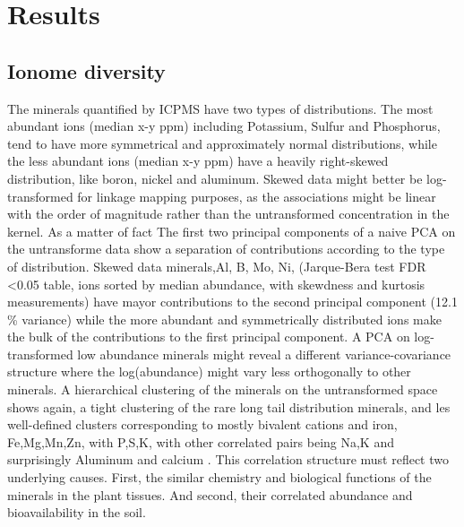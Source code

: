 \section{Results}
\subsection{Ionome diversity}
The minerals quantified by ICPMS have two types of distributions. The most abundant ions (median x-y ppm) including Potassium, Sulfur and Phosphorus, tend to have more symmetrical and approximately normal distributions, while the less abundant ions (median x-y ppm) have a  heavily right-skewed distribution, like boron, nickel and aluminum.
Skewed data might better be log-transformed for linkage mapping purposes, as the associations might be linear with the order of magnitude rather than the untransformed concentration in the kernel. As a matter of fact The first two principal components of a naive PCA on the untransforme data show a separation of contributions according to the type of distribution.
Skewed data minerals,Al, B, Mo, Ni, (Jarque-Bera test FDR <0.05 table, ions sorted by median abundance, with skewdness and kurtosis measurements) have mayor contributions to the second principal component (12.1 \% variance) while the more abundant and symmetrically distributed ions make the bulk of the contributions to the first principal component.
A PCA on log-transformed low abundance minerals might reveal a different variance-covariance structure where the log(abundance) might vary less orthogonally to other minerals. A hierarchical clustering of the minerals on the untransformed space shows again, a tight clustering of the rare long tail distribution minerals, and les well-defined clusters corresponding to mostly bivalent cations and iron, Fe,Mg,Mn,Zn, with P,S,K, with other correlated pairs being Na,K and surprisingly Aluminum and calcium . This correlation structure must reflect two underlying causes.
First, the similar chemistry and biological functions of the minerals in the plant tissues. And second, their correlated abundance and bioavailability in the soil.
\clearpage

